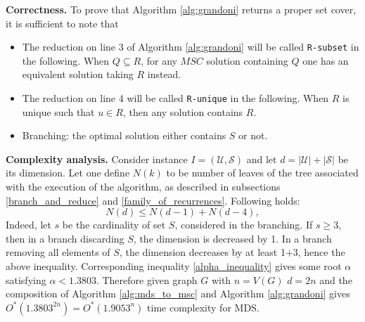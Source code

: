 \textbf{Correctness.} To prove that Algorithm \ref{alg:grandoni} returns a proper set cover, it is sufficient to note that
\begin{itemize}
    \item The reduction on line 3 of Algorithm \ref{alg:grandoni} will be called \texttt{R-subset} in the following. When $Q \subseteq R$, for any $MSC$ solution containing $Q$ one has an equivalent solution taking $R$ instead.
    \item The reduction on line 4 will be called \texttt{R-unique} in the following. When $R$ is unique such that $u\in R$, then any solution contains $R$.
    \item Branching: the optimal solution either contains $S$ or not.
\end{itemize}
\textbf{Complexity analysis.} 
Consider instance $I = (\mathcal{U}, \mathcal{S})$ and let $d = |\mathcal{U}| + |\mathcal{S}|$ be its dimension. Let one define $N(k)$ to be number of leaves of the tree associated with the execution of the algorithm, as described in subsections \ref{branch_and_reduce} and \ref{family_of_recurrences}. Following holds:
$$
N(d) \leq N(d -1) + N(d - 4),
$$
Indeed, let $s$ be the cardinality of set $S$, considered in the branching. If $s \geq 3$, then in a branch discarding $S$, the dimension is decreased by 1. In a branch removing all elements of $S$, the dimension decreases by at least 1+3, hence the above inequality. Corresponding inequality \eqref{alpha_inequality} gives some root $\alpha$ satisfying $\alpha < 1.3803$. Therefore given graph $G$ with $n = V(G)$ $d=2n$ and the composition of Algorithm \ref{alg:mds_to_msc} and Algorithm \ref{alg:grandoni} gives $O^*(1.3803^{2n}) = O^*(1.9053^n)$ time complexity for MDS.

